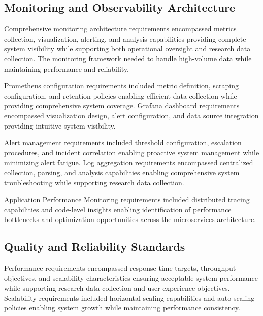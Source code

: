 \subsection{Monitoring and Observability Architecture}

Comprehensive monitoring architecture requirements encompassed metrics collection, visualization, alerting, and analysis capabilities providing complete system visibility while supporting both operational oversight and research data collection. The monitoring framework needed to handle high-volume data while maintaining performance and reliability.

Prometheus configuration requirements included metric definition, scraping configuration, and retention policies enabling efficient data collection while providing comprehensive system coverage. Grafana dashboard requirements encompassed visualization design, alert configuration, and data source integration providing intuitive system visibility.


Alert management requirements included threshold configuration, escalation procedures, and incident correlation enabling proactive system management while minimizing alert fatigue. Log aggregation requirements encompassed centralized collection, parsing, and analysis capabilities enabling comprehensive system troubleshooting while supporting research data collection.

Application Performance Monitoring requirements included distributed tracing capabilities and code-level insights enabling identification of performance bottlenecks and optimization opportunities across the microservices architecture.

\subsection{Quality and Reliability Standards}

Performance requirements encompassed response time targets, throughput objectives, and scalability characteristics ensuring acceptable system performance while supporting research data collection and user experience objectives. Scalability requirements included horizontal scaling capabilities and auto-scaling policies enabling system growth while maintaining performance consistency.

